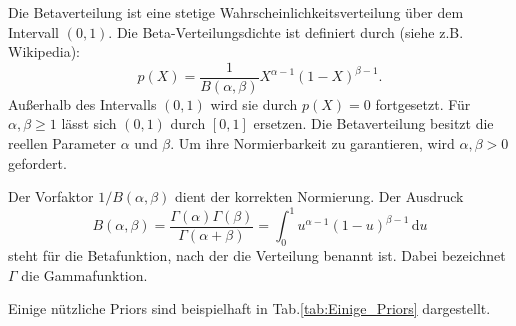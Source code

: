 Die Betaverteilung ist eine stetige Wahrscheinlichkeitsverteilung über dem Intervall $( 0 , 1 )$.
Die Beta-Verteilungsdichte ist definiert durch (siehe z.B. Wikipedia):
\[
p(X) = \frac{1}{B(\alpha,\beta)} X^{\alpha-1}(1-X)^{\beta-1}.
\]
Außerhalb des Intervalls $(0,1)$ wird sie durch $p(X)=0$ fortgesetzt.
Für $\alpha,\beta \geq 1$ lässt sich $(0,1)$ durch $[0,1]$ ersetzen. Die Betaverteilung besitzt die reellen Parameter $\alpha$ und $\beta$. Um ihre Normierbarkeit zu garantieren, wird $\alpha,\beta > 0$ gefordert.

Der Vorfaktor $1/B(\alpha,\beta)$ dient der korrekten Normierung. Der Ausdruck
\[B(\alpha,\beta) = \frac{\Gamma(\alpha) \Gamma(\beta)}{\Gamma(\alpha+\beta)} = \int_0^1 u^{\alpha-1} (1-u)^{\beta-1}\, \mathrm{d}u
\]
steht für die Betafunktion, nach der die Verteilung benannt ist. Dabei bezeichnet $\Gamma$ die Gammafunktion.

Einige nützliche Priors sind beispielhaft in Tab.\ref{tab:Einige_Priors} dargestellt.


